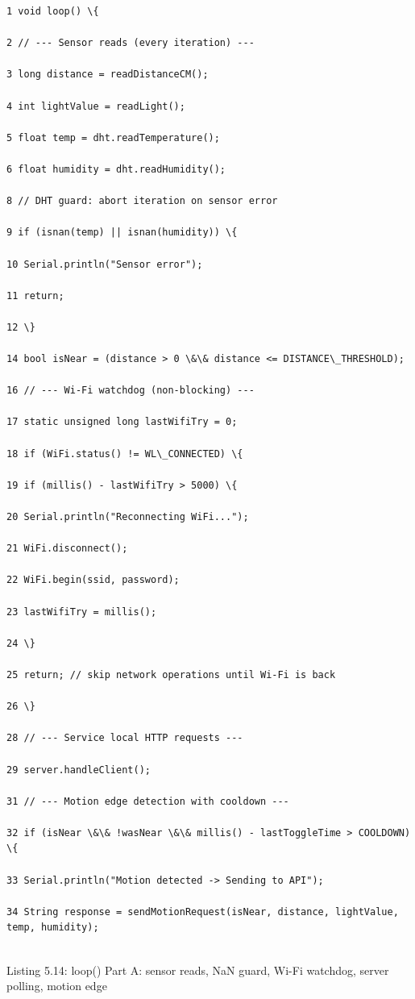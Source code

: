 \begin{listingbox}
	\begin{verbatim}
1 void loop() \{

2 // --- Sensor reads (every iteration) ---

3 long distance = readDistanceCM();

4 int lightValue = readLight();

5 float temp = dht.readTemperature();

6 float humidity = dht.readHumidity();

8 // DHT guard: abort iteration on sensor error

9 if (isnan(temp) || isnan(humidity)) \{

10 Serial.println("Sensor error");

11 return;

12 \}

14 bool isNear = (distance > 0 \&\& distance <= DISTANCE\_THRESHOLD);

16 // --- Wi-Fi watchdog (non-blocking) ---

17 static unsigned long lastWifiTry = 0;

18 if (WiFi.status() != WL\_CONNECTED) \{

19 if (millis() - lastWifiTry > 5000) \{

20 Serial.println("Reconnecting WiFi...");

21 WiFi.disconnect();

22 WiFi.begin(ssid, password);

23 lastWifiTry = millis();

24 \}

25 return; // skip network operations until Wi-Fi is back

26 \}

28 // --- Service local HTTP requests ---

29 server.handleClient();

31 // --- Motion edge detection with cooldown ---

32 if (isNear \&\& !wasNear \&\& millis() - lastToggleTime > COOLDOWN) \{

33 Serial.println("Motion detected -> Sending to API");

34 String response = sendMotionRequest(isNear, distance, lightValue, temp, humidity);


\end{verbatim}
\end{listingbox}
Listing 5.14: loop() Part A: sensor reads, NaN guard, Wi-Fi watchdog, server polling, motion edge

